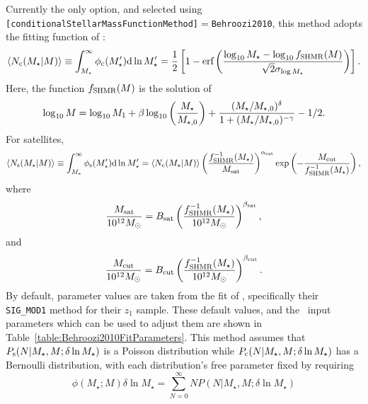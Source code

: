 Currently the only option, and selected using {\tt [conditionalStellarMassFunctionMethod]}$=${\tt Behroozi2010}, this method adopts the fitting function of \cite{behroozi_comprehensive_2010}:
\begin{equation}
 \langle N_{\rm c}(M_\star|M)\rangle \equiv \int_{M_\star}^\infty \phi_{\rm c}(M_\star^\prime) \d \ln M_\star^\prime = {1 \over 2} \left[ 1 - \hbox{erf}\left( {\log_{10}M_\star - \log_{10} f_{\rm SHMR}(M) \over \sqrt{2}\sigma_{\log M_\star}} \right) \right].
\end{equation}
Here, the function $f_{\rm SHMR}(M)$ is the solution of
\begin{equation}
 \log_{10}M = \log_{10}M_1 + \beta \log_{10}\left({M_\star \over M_{\star,0}}\right) + {(M_\star/M_{\star,0})^\delta \over 1 + (M_\star/M_{\star,0})^{-\gamma}} - {1/2}.
\end{equation}
For satellites,
\begin{equation}
 \langle N_{\rm s}(M_\star|M)\rangle \equiv \int_{M_\star}^\infty \phi_{\rm s}(M_\star^\prime) \d \ln M_\star^\prime =  \langle N_{\rm c}(M_\star|M)\rangle \left({f^{-1}_{\rm SHMR}(M_\star) \over M_{\rm sat}}\right)^{\alpha_{\rm sat}} \exp\left(- {M_{\rm cut} \over f^{-1}_{\rm SHMR}(M_\star)} \right),
\end{equation}
where
\begin{equation}
 {M_{\rm sat} \over 10^{12} M_\odot} = B_{\rm sat} \left({f^{-1}_{\rm SHMR}(M_\star) \over 10^{12} M_\odot}\right)^{\beta_{\rm sat}},
\end{equation}
and
\begin{equation}
 {M_{\rm cut} \over 10^{12} M_\odot} = B_{\rm cut} \left({f^{-1}_{\rm SHMR}(M_\star) \over 10^{12} M_\odot}\right)^{\beta_{\rm cut}}.
\end{equation}
By default, parameter values are taken from the fit of \cite{leauthaud_new_2011}, specifically their {\tt SIG\_MOD1} method for their $z_1$ sample. These default values, and the \glc\ input parameters which can be used to adjust them are shown in Table~\ref{table:Behroozi2010FitParameters}. This method assumes that $P_{\rm s}(N|M_\star,M;\delta \ln M_\star)$ is a Poisson distribution while $P_{\rm c}(N|M_\star,M;\delta \ln M_\star)$ has a Bernoulli distribution, with each distribution's free parameter fixed by requiring
\begin{equation}
 \phi(M_\star;M) \delta \ln M_\star = \sum_{N=0}^\infty N P(N|M_\star,M;\delta \ln M_\star)
\end{equation}

